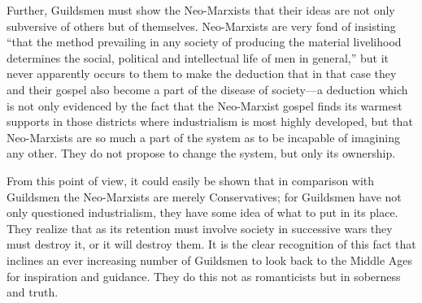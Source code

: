 \documentclass{book}
\begin{document}
Further, Guildsmen must show the Neo-Marxists that their ideas are not only subversive of others but of themselves. Neo-Marxists are very fond of insisting “that the method prevailing in any society of producing the material livelihood determines the social, political and intellectual life of men in general,” but it never apparently occurs to them to make the deduction that in that case they and their gospel also become a part of the disease of society—a deduction which is not only evidenced by the fact that the Neo-Marxist gospel finds its warmest supports in those districts where industrialism is most highly developed, but that Neo-Marxists are so much a part of the system as to be incapable of imagining any other. They do not propose to change the system, but only its ownership.

From this point of view, it could easily be shown that in comparison with Guildsmen the Neo-Marxists are merely Conservatives; for Guildsmen have not only questioned industrialism, they have some idea of what to put in its place. They realize that as its retention must involve society in successive wars they must destroy it, or it will destroy them. It is the clear recognition of this fact that inclines an ever increasing number of Guildsmen to look back to the Middle Ages for inspiration and guidance. They do this not as romanticists but in soberness and truth.

\end{document}
